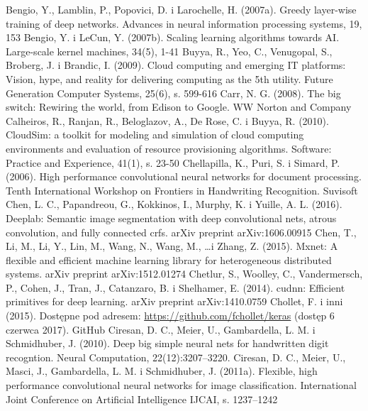 \documentclass[12pt,a4paper,twoside]{article}
\begin{document}
\begin{thebibliography}{99}
 Bengio, Y., Lamblin, P., Popovici, D. i Larochelle, H. (2007a). Greedy layer-wise training of deep networks. Advances in neural information processing systems, 19, 153
 Bengio, Y. i LeCun, Y. (2007b). Scaling learning algorithms towards AI. Large-scale kernel machines, 34(5), 1-41
 Buyya, R., Yeo, C., Venugopal, S., Broberg, J. i Brandic, I. (2009). Cloud computing and emerging IT platforms: Vision, hype, and reality for delivering computing as the 5th utility. Future Generation Computer Systems, 25(6), s. 599-616
 Carr, N. G. (2008). The big switch: Rewiring the world, from Edison to Google. WW Norton and Company
 Calheiros, R., Ranjan, R., Beloglazov, A., De Rose, C. i Buyya, R. (2010). CloudSim: a toolkit for modeling and simulation of cloud computing environments and evaluation of resource provisioning algorithms. Software: Practice and Experience, 41(1), s. 23-50
 Chellapilla, K., Puri, S. i Simard, P. (2006). High performance convolutional neural networks for document processing. Tenth International Workshop on Frontiers in Handwriting Recognition. Suvisoft
 Chen, L. C., Papandreou, G., Kokkinos, I., Murphy, K. i Yuille, A. L. (2016). Deeplab: Semantic image segmentation with deep convolutional nets, atrous convolution, and fully connected crfs. arXiv preprint arXiv:1606.00915
 Chen, T., Li, M., Li, Y., Lin, M., Wang, N., Wang, M., \ldots i Zhang, Z. (2015). Mxnet: A flexible and efficient machine learning library for heterogeneous distributed systems. arXiv preprint arXiv:1512.01274
 Chetlur, S., Woolley, C., Vandermersch, P., Cohen, J., Tran, J., Catanzaro, B. i Shelhamer, E. (2014). cudnn: Efficient primitives for deep learning. arXiv preprint arXiv:1410.0759
 Chollet, F. i inni (2015). Dostępne pod adresem: \url{https://github.com/fchollet/keras} (dostęp 6 czerwca 2017). GitHub
 Ciresan, D. C., Meier, U., Gambardella, L. M. i Schmidhuber, J. (2010). Deep big simple neural nets for handwritten digit recogntion. Neural Computation, 22(12):3207–3220.
 Ciresan, D. C., Meier, U., Masci, J., Gambardella, L. M. i Schmidhuber, J. (2011a). Flexible, high performance convolutional neural networks for image classification. International Joint Conference on Artificial Intelligence IJCAI, s. 1237–1242

\end{thebibliography}
\end{document}
